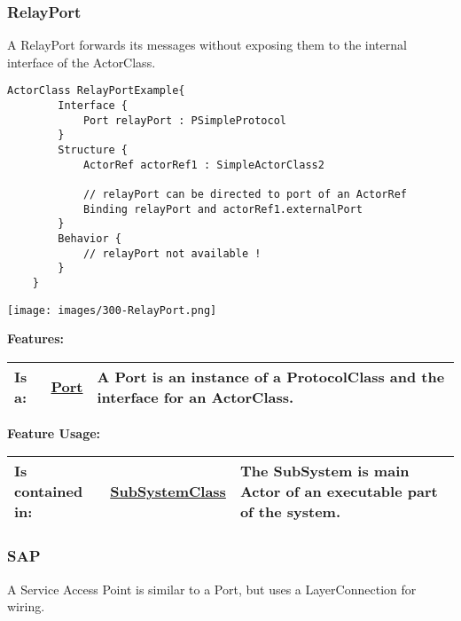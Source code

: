 	\vspace{\baselineskip}
	\vspace{\baselineskip}
	\vspace{\baselineskip}
	
\subsubsection{RelayPort}
	\hypertarget{ref:RelayPort}{}
	A RelayPort forwards its messages without exposing them to the internal interface of the ActorClass.
		
	\begin{lstlisting}[language=ROOM]
	ActorClass RelayPortExample{
		Interface {
			Port relayPort : PSimpleProtocol
		}
		Structure {
			ActorRef actorRef1 : SimpleActorClass2
			
			// relayPort can be directed to port of an ActorRef
			Binding relayPort and actorRef1.externalPort
		}
		Behavior {
			// relayPort not available !
		}
	}
	\end{lstlisting}
	\texttt{[image: images/300-RelayPort.png]}
		
		
	\begingroup
	\textbf{Features:}
	\renewcommand{\arraystretch}{1.8} %
	\begin{longtable}{l|l p{}}
		\hline
	Is a: & \tabitem \hyperlink{ref:Port}{Port}  & A Port is an instance of a ProtocolClass and the interface for an ActorClass.\\
	\hline
	\end{longtable}
	\endgroup
		
	\begingroup
	\textbf{Feature Usage:}
	\renewcommand{\arraystretch}{1.8} %
	\begin{longtable}{l|l p{}}
		\hline
	Is contained in: & \tabitem \hyperlink{ref:SubSystemClass}{SubSystemClass}  & The SubSystem is main Actor of an executable part of the system. \\
	\hline
	\end{longtable}
	\endgroup
		
	
	\vspace{\baselineskip}
	\vspace{\baselineskip}
	\vspace{\baselineskip}
	
\subsubsection{SAP}
	\hypertarget{ref:SAP}{}
	A Service Access Point is similar to a Port, but uses a LayerConnection for wiring.
		
